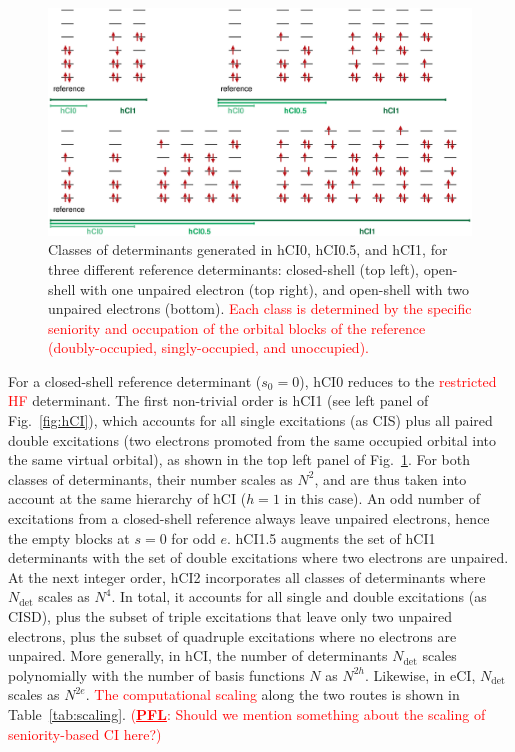 \documentclass[aip,jcp,reprint,noshowkeys,superscriptaddress]{revtex4-1}
\newcommand{\titou}[1]{\textcolor{red}{#1}}
\newcommand{\PFL}[1]{\titou{(\underline{\bf PFL}: #1)}}
\newcommand{\Ndet}{N_\text{det}}
\begin{document}
\begin{figure}%
\includegraphics[width=1.0\linewidth]{determinants}
\caption{Classes of determinants generated in hCI0, hCI0.5, and hCI1, for three different reference determinants:
closed-shell (top left), open-shell with one unpaired electron (top right), and open-shell with two unpaired electrons (bottom).
\titou{Each class is determined by the specific seniority and occupation of the orbital blocks of the reference (doubly-occupied, singly-occupied, and unoccupied).}}
\label{fig:determinants}
\end{figure}


For a closed-shell reference determinant ($s_0=0$), hCI0 reduces to the \titou{restricted HF} determinant.
The first non-trivial order is hCI1 (see left panel of Fig.~\ref{fig:hCI}), which accounts for all single excitations (as CIS)
plus all paired double excitations (two electrons promoted from the same occupied orbital into the same virtual orbital),
as shown in the top left panel of Fig.~\ref{fig:determinants}.
For both classes of determinants, their number scales as $N^2$, and are thus taken into account at the same hierarchy of hCI ($h=1$ in this case).
An odd number of excitations from a closed-shell reference always leave unpaired electrons, hence the empty blocks at $s=0$ for odd $e$.
hCI1.5 augments the set of hCI1 determinants with the set of double excitations where two electrons are unpaired.
At the next integer order, hCI2 incorporates all classes of determinants where $\Ndet$ scales as $N^4$.
In total, it accounts for all single and double excitations (as CISD), plus the subset of triple excitations that leave only two unpaired electrons,
plus the subset of quadruple excitations where no electrons are unpaired.
More generally, in hCI, the number of determinants $\Ndet$ scales polynomially with the number of basis functions $N$ as $N^{2h}$.
Likewise, in eCI, $\Ndet$ scales as $N^{2e}$.
\titou{The computational scaling} along the two routes is shown in Table~\ref{tab:scaling}.
\PFL{Should we mention something about the scaling of seniority-based CI here?}
\end{document}
